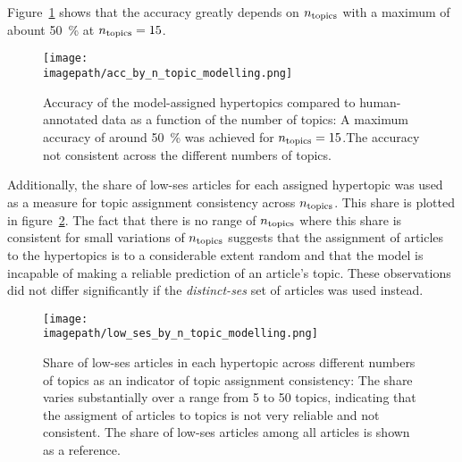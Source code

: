 Figure~\ref{fig:accuracy_by_ntopics} shows that the accuracy greatly depends on $n_\text{topics}$ with a maximum of abount \SI{50}{\percent} at $n_\text{topics}=15$.

\begin{figure}
    \centering
    \texttt{[image: \\imagepath/acc\_by\_n\_topic\_modelling.png]}
    \caption{Accuracy of the model-assigned hypertopics compared to human-annotated data as a function of the number of topics: A maximum accuracy of around \SI{50}{\percent} was achieved for $n_\text{topics}=15$.The accuracy not consistent across the different numbers of topics.}\label{fig:accuracy_by_ntopics}
\end{figure}

Additionally, the share of low-\gls{ses} articles for each assigned hypertopic was used as a measure for topic assignment consistency across $n_\text{topics}$. This share is plotted in figure~\ref{fig:lowshare_per_ntopics}. The fact that there is no range of $n_\text{topics}$ where this share is consistent for small variations of $n_\text{topics}$ suggests that the assignment of articles to the hypertopics is to a considerable extent random and that the model is incapable of making a reliable prediction of an article's topic. These observations did not differ significantly if the \textit{distinct-\gls{ses}} set of articles was used instead.

\begin{figure}
    \centering
    \texttt{[image: \\imagepath/low\_ses\_by\_n\_topic\_modelling.png]}
    \caption{Share of low-\gls{ses} articles in each hypertopic across different numbers of topics as an indicator of topic assignment consistency: The share varies substantially over a range from \SI{5}{} to \SI{50}{} topics, indicating that the assigment of articles to topics is not very reliable and not consistent. The share of low-\gls{ses} articles among all articles is shown as a reference.}\label{fig:lowshare_per_ntopics}
\end{figure}

